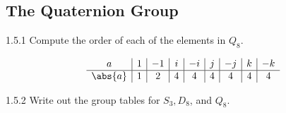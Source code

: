 \subsection{The Quaternion Group}

\begin{exercise}{1.5.1}
    Compute the order of each of the elements in $Q_8$.
\end{exercise}

\begin{sol}
    \[
    	\begin{array}{*{8}{c|}c}
            a & 1 & -1 & i & -i & j & -j & k & -k \\
            \hline
            \abs{a} & 1 & 2 & 4 & 4 & 4 & 4 & 4 & 4
        \end{array}
	\]
\end{sol}

\begin{exercise}{1.5.2}
    Write out the group tables for $S_3, D_8$, and $Q_8$.

\end{exercise}

